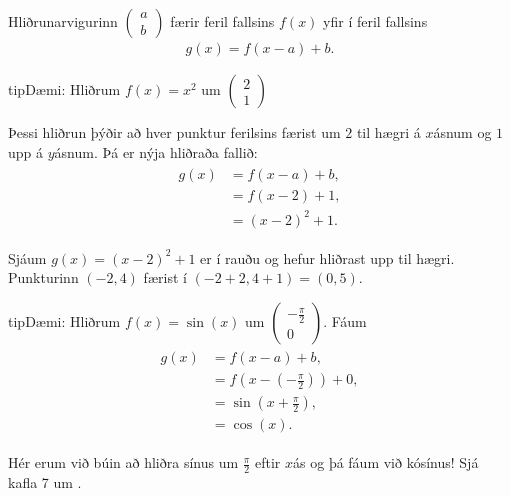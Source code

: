 \documentclass[a4paper,10pt,icelandic]{sphinxmanual}
\begin{document}
Hliðrunarvigurinn \(\begin{pmatrix} a \\ b \end{pmatrix}\) færir feril fallsins \(f(x)\) yfir í feril fallsins
\begin{equation*}
\begin{split}g(x) =f(x-a)+b.\end{split}
\end{equation*}
\begin{sphinxadmonition}{tip}{Dæmi:}
Hliðrum \(f(x) = x^2\) um \(\begin{pmatrix} 2 \\ 1 \end{pmatrix}\)

Þessi hliðrun þýðir að hver punktur ferilsins færist um \(2\) til hægri á \(x\)\sphinxhyphen{}ásnum og \(1\) upp á \(y\)\sphinxhyphen{}ásnum. Þá er nýja hliðraða fallið:
\begin{equation*}
\begin{split}\begin{aligned}
 g(x) &= f(x-a)+b, \\
 &= f(x-2)+1, \\
 &= (x-2)^2 +1.
\end{aligned}\end{split}
\end{equation*}

Sjáum \(g(x)= (x-2)^2 +1\) er í rauðu og hefur hliðrast upp til hægri.
Punkturinn \((-2,4)\) færist í \((-2+2,4+1)=(0,5)\).
\end{sphinxadmonition}

\begin{sphinxadmonition}{tip}{Dæmi:}
Hliðrum \(f(x) = \sin(x)\) um \(\begin{pmatrix} -\frac{\pi}{2} \\ 0 \end{pmatrix}\). Fáum
\begin{equation*}
\begin{split}\begin{aligned}
 g(x) &= f(x-a)+b, \\
 &= f(x-(-\frac{\pi}{2}))+0, \\
 &= \sin(x+\frac{\pi}{2}), \\
 &= \cos(x).
\end{aligned}\end{split}
\end{equation*}

Hér erum við búin að hliðra sínus um \(\frac{\pi}{2}\) eftir \(x\)\sphinxhyphen{}ás og þá fáum við kósínus! Sjá kafla 7 um {\hyperref[\detokenize{Kafli07:s-hornafoll}]{}}.
\end{sphinxadmonition}
\end{document}
